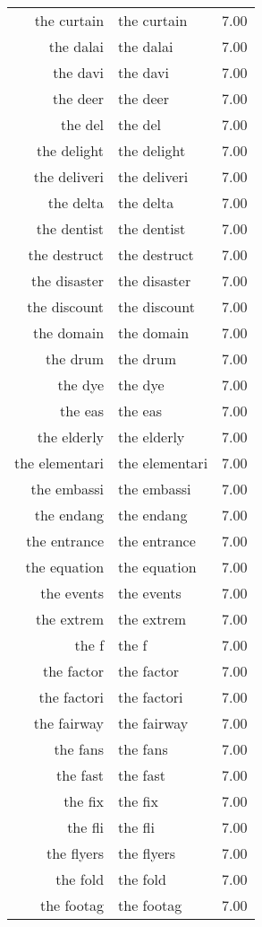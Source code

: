 \begin{table}[ht]
\begin{tabular}{rlr}
  the curtain & the curtain & 7.00 \\ 
  the dalai & the dalai & 7.00 \\ 
  the davi & the davi & 7.00 \\ 
  the deer & the deer & 7.00 \\ 
  the del & the del & 7.00 \\ 
  the delight & the delight & 7.00 \\ 
  the deliveri & the deliveri & 7.00 \\ 
  the delta & the delta & 7.00 \\ 
  the dentist & the dentist & 7.00 \\ 
  the destruct & the destruct & 7.00 \\ 
  the disaster & the disaster & 7.00 \\ 
  the discount & the discount & 7.00 \\ 
  the domain & the domain & 7.00 \\ 
  the drum & the drum & 7.00 \\ 
  the dye & the dye & 7.00 \\ 
  the eas & the eas & 7.00 \\ 
  the elderly & the elderly & 7.00 \\ 
  the elementari & the elementari & 7.00 \\ 
  the embassi & the embassi & 7.00 \\ 
  the endang & the endang & 7.00 \\ 
  the entrance & the entrance & 7.00 \\ 
  the equation & the equation & 7.00 \\ 
  the events & the events & 7.00 \\ 
  the extrem & the extrem & 7.00 \\ 
  the f & the f & 7.00 \\ 
  the factor & the factor & 7.00 \\ 
  the factori & the factori & 7.00 \\ 
  the fairway & the fairway & 7.00 \\ 
  the fans & the fans & 7.00 \\ 
  the fast & the fast & 7.00 \\ 
  the fix & the fix & 7.00 \\ 
  the fli & the fli & 7.00 \\ 
  the flyers & the flyers & 7.00 \\ 
  the fold & the fold & 7.00 \\ 
  the footag & the footag & 7.00 \\ 

\end{tabular}
\end{table}
